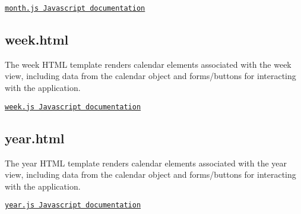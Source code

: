 \href{https://github.com/SLongofono/448_Project1/blob/master/app/static/js/month.js}{\tt month.\+js Javascript documentation}\hypertarget{template_dox_week}{}\subsection{week.\+html}\label{template_dox_week}
The week H\+T\+ML template renders calendar elements associated with the week view, including data from the calendar object and forms/buttons for interacting with the application.

\href{https://github.com/SLongofono/448_Project1/blob/master/app/static/js/week.js}{\tt week.\+js Javascript documentation}\hypertarget{template_dox_year}{}\subsection{year.\+html}\label{template_dox_year}
The year H\+T\+ML template renders calendar elements associated with the year view, including data from the calendar object and forms/buttons for interacting with the application.

\href{https://github.com/SLongofono/448_Project1/blob/master/app/static/js/year.js}{\tt year.\+js Javascript documentation} 